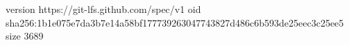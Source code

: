 version https://git-lfs.github.com/spec/v1
oid sha256:1b1e075e7da3b7e14a58bf177739263047743827d486c6b593de25eec3c25ee5
size 3689
